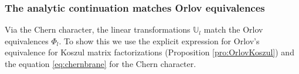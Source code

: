 \documentclass[11pt]{amsart}
\newtheorem{lem}[thm]{Lemma} %
\theoremstyle{definition} %
\theoremstyle{remark} %
\newcommand{\CC}{\mathbb C}
\newcommand{\PP}{\mathbb P}
\newcommand{\UU}{\mathbb U}
\newcommand{\ZZ}{\mathbb Z}
\newcommand{\nar}{\operatorname{nar}}
\newcommand{\la}{\lambda}
\newcommand{\tw}{{\rm tw}}
\def\pmmu{{\pmb \mu}}
\def\CR{\operatorname{\text{CR}}}
\def\ol{\overline}
\def\fracp#1{\left\langle #1 \right\rangle}
\newcommand{\frF}{\mathfrak{F}}
\newcommand{\unit}{\boldsymbol{1}}
\newcommand{\Nar}{\operatorname{\mathsf{Nar}}}
\newcommand{\amb}{\operatorname{amb}}
\renewcommand{\CR}{{\operatorname{CR}}}
\newcommand{\iu}{\mathtt{i}}
\newcommand{\uw}{\underline{w}}
\begin{document}


\subsubsection{The analytic continuation matches Orlov equivalences}
Via the Chern character, the linear transformations 
$\UU_l$ match the Orlov equivalences $\Phi_l$. 
To show this we use the explicit expression 
for Orlov's equivalence 
for Koszul matrix factorizations 
(Proposition \ref{pro:OrlovKoszul})  
and the equation \eqref{eq:chernbrane} 
for the Chern character. 
\end{document}
